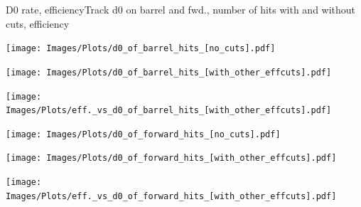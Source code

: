 \documentclass{beamer}
\begin{document}
\begin{frame}{D0 rate, efficiency}{Track d0 on barrel and fwd., number of hits with and without cuts, efficiency}
  \begin{minipage}{0.32\textwidth}
    \centering
    \texttt{[image: Images/Plots/d0\_of\_barrel\_hits\_[no\_cuts].pdf]}
  \end{minipage}%
  \hspace{0.01\textwidth}%
  \begin{minipage}{0.32\textwidth}
    \centering
    \texttt{[image: Images/Plots/d0\_of\_barrel\_hits\_[with\_other\_effcuts].pdf]}
  \end{minipage}%
  \hspace{0.01\textwidth}%
  \begin{minipage}{0.32\textwidth}
    \centering
    \texttt{[image: Images/Plots/eff.\_vs\_d0\_of\_barrel\_hits\_[with\_other\_effcuts].pdf]}
  \end{minipage}
  \vspace*{0.2cm}
  \begin{minipage}{0.32\textwidth}
    \centering
    \texttt{[image: Images/Plots/d0\_of\_forward\_hits\_[no\_cuts].pdf]}
  \end{minipage}%
  \hspace{0.01\textwidth}%
  \begin{minipage}{0.32\textwidth}
    \centering
    \texttt{[image: Images/Plots/d0\_of\_forward\_hits\_[with\_other\_effcuts].pdf]}
  \end{minipage}%
  \hspace{0.01\textwidth}%
  \begin{minipage}{0.32\textwidth}
    \centering
    \texttt{[image: Images/Plots/eff.\_vs\_d0\_of\_forward\_hits\_[with\_other\_effcuts].pdf]}
  \end{minipage}
\end{frame}
\end{document}
